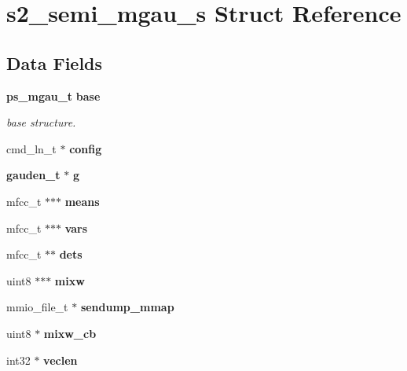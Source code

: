 \section{s2\-\_\-semi\-\_\-mgau\-\_\-s Struct Reference}
\label{structs2__semi__mgau__s}
\subsection*{Data Fields}
\begin{DoxyCompactItemize}
\item 
{\bf ps\-\_\-mgau\-\_\-t} {\bf base}
\begin{DoxyCompactList}\small\item\em base structure. \end{DoxyCompactList}\item 
cmd\-\_\-ln\-\_\-t $\ast$ {\bfseries config}\label{structs2__semi__mgau__s_ababf1e9522fb14c351df9a6b6d3957bc}

\item 
{\bf gauden\-\_\-t} $\ast$ {\bfseries g}\label{structs2__semi__mgau__s_ab9d5d5dcafa40af8869ceabb60a8d35b}

\item 
mfcc\-\_\-t $\ast$$\ast$$\ast$ {\bfseries means}\label{structs2__semi__mgau__s_a22ebad1d9b3ffa6dad349cc3eec0b092}

\item 
mfcc\-\_\-t $\ast$$\ast$$\ast$ {\bfseries vars}\label{structs2__semi__mgau__s_a724a8e6bca376cbd091c1ab4ddeb43e0}

\item 
mfcc\-\_\-t $\ast$$\ast$ {\bfseries dets}\label{structs2__semi__mgau__s_ad93b0a6ed646349a2a81f88acbb535dd}

\item 
uint8 $\ast$$\ast$$\ast$ {\bfseries mixw}\label{structs2__semi__mgau__s_a1207b5db7e37e9477f3b55cc2d447050}

\item 
mmio\-\_\-file\-\_\-t $\ast$ {\bfseries sendump\-\_\-mmap}\label{structs2__semi__mgau__s_a66a60126fe057d36640cbf69f916bca3}

\item 
uint8 $\ast$ {\bfseries mixw\-\_\-cb}\label{structs2__semi__mgau__s_a20ec32cb8c38fb48909b2cc7c5412c3b}

\item 
int32 $\ast$ {\bfseries veclen}\label{structs2__semi__mgau__s_a73331a6f5833db8cd4c8301ffe54be5e}


\end{DoxyCompactItemize}
